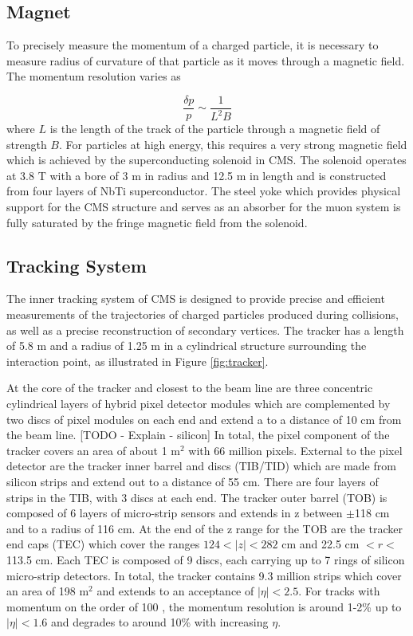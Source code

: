  \subsection{Magnet}
To precisely measure the momentum of a charged particle, 
 it is necessary to measure radius of curvature 
 of that particle as it moves through a magnetic field.
The momentum resolution varies as 

\begin{equation}\label{eq:res_mag}
\frac{\delta p}{p} \sim \frac{1}{L^2B}
\end{equation}
 where $L$ is the length of the track of the 
 particle through a magnetic field of
 strength $B$.
For particles at high energy, this requires a very strong
 magnetic field which is achieved by the superconducting 
 solenoid in CMS.
The solenoid operates at 3.8 T with 
 a bore of 3 m in radius and 12.5 m in length
 and is constructed from four layers of NbTi superconductor.
The steel yoke which provides physical support for the 
 CMS structure and serves as an absorber for the
 muon system is fully saturated by the fringe magnetic field
 from the solenoid.

 \subsection{Tracking System}
The inner tracking system of CMS is designed to provide
 precise and efficient measurements of the trajectories
 of charged particles produced during collisions,
 as well as a precise reconstruction of secondary vertices.
The tracker has a length of 5.8 m and a radius of
 1.25 m in a cylindrical structure surrounding the 
 interaction point, as illustrated in Figure \ref{fig:tracker}.

At the core of the tracker and closest to the beam line
 are three concentric cylindrical layers %
 of hybrid pixel detector modules which are complemented
 by two discs of pixel modules on each end
 and extend a to a distance of 10 cm from the beam line.
[TODO - Explain - silicon]
In total, the pixel component of the tracker covers
 an area of about 1 m$^2$ with 66 million pixels.
External to the pixel detector are the tracker inner barrel and discs (TIB/TID)
 which are made from silicon strips and extend 
 out to a distance of 55 cm.
There are four layers of strips in the TIB, with 3 discs at each end.
The tracker outer barrel (TOB) is composed of
 6 layers of micro-strip sensors and extends
 in z between $\pm$118 cm and to a radius of 116 cm.
At the end of the z range for the TOB are the
 tracker end caps (TEC) which cover the ranges
 $124<|z|<282$ cm and 22.5 cm $<r<$113.5 cm.
Each TEC is composed of 9 discs,
 each carrying up to 7 rings of silicon micro-strip detectors.
In total, the tracker contains 9.3 million strips
 which cover an area of 198 m$^2$ and extends
 to an acceptance of $|\eta|<2.5$.
For tracks with momentum on the order of 100 \GeV,
 the momentum resolution is around 1-2\% up to $|\eta|<1.6$
 and degrades to around 10\% with increasing $\eta$.

